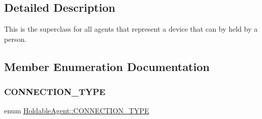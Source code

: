 \subsection{Detailed Description}
This is the superclass for all agents that represent a device that can by held by a person. 

\subsection{Member Enumeration Documentation}
\mbox{\label{class_holdable_agent_ae2c334b004d7b9c5a999cf2618e4e518}} 
\subsubsection{\texorpdfstring{CONNECTION\_TYPE}{CONNECTION\_TYPE}}
{\footnotesize\ttfamily enum \mbox{\hyperlink{class_holdable_agent_ae2c334b004d7b9c5a999cf2618e4e518}{Holdable\+Agent\+::\+C\+O\+N\+N\+E\+C\+T\+I\+O\+N\+\_\+\+T\+Y\+PE}}}

